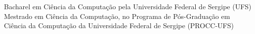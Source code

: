 %
%
%


\begin{scholarship}
	 {Bacharel em Ciência da Computação pela Universidade Federal de Sergipe (UFS)}
	 {Mestrado em Ciência da Computação, no Programa de Pós-Graduação em Ciência da Computação da Universidade Federal de Sergipe (PROCC-UFS)}
\end{scholarship}